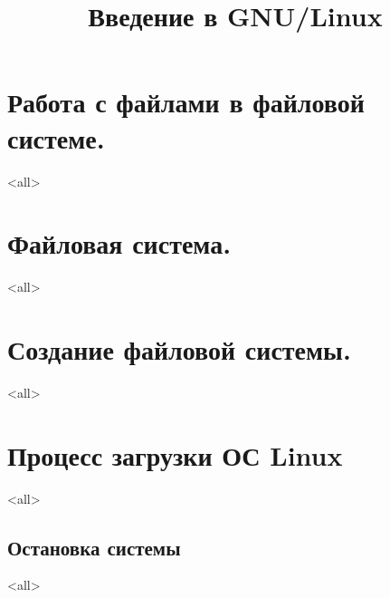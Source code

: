

\title{Введение в GNU/Linux}




\begin{frame}
	\frametitle{}
	\titlepage
	\vspace{-0.5cm}
	\begin{center}
	\end{center}
\end{frame}


\begin{frame}
	\tableofcontents
	[hideallsubsections]
\end{frame}


\section{Работа с файлами в файловой системе.}
\mode<all>{}
\section{Файловая система.}
\mode<all>{}
\section{Создание файловой системы.}
\mode<all>{}
\section{Процесс загрузки ОС Linux}
\mode<all>{}
\subsection{Остановка системы}
\mode<all>{}

\bye

